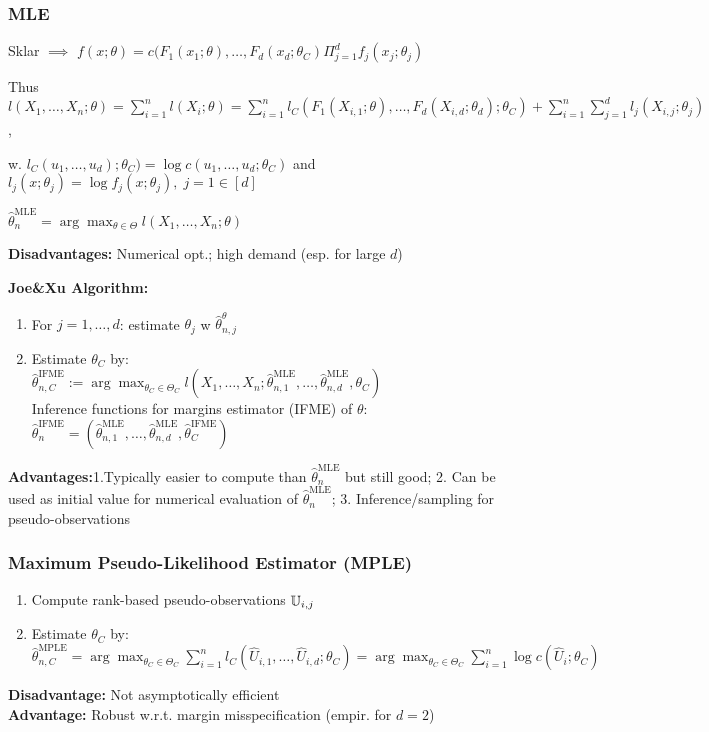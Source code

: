 \subsubsection*{MLE}
Sklar $\implies$ $f(x;\theta)=c(F_1(x_1;\theta),\dots, F_d(x_d;\theta_C)\Pi^d_{j=1} f_j(x_j;\theta_j)$

Thus $l(X_1,\dots,X_n;\theta)=\sum^n_{i=1} l(X_i;\theta)=\sum^n_{i=1} l_C(F_1(X_{i,1};\theta),\dots,F_d(X_{i,d};\theta_d);\theta_C)+\sum^n_{i=1}\sum^d_{j=1} l_j(X_{i,j};\theta_j)$,

w. $l_C(u_1,\dots, u_d);\theta_C)=\log c(u_1,\dots,u_d;\theta_C)$ and $l_j(x;\theta_j)=\log f_j(x;\theta_j),\; j=1\in[d]$

$\hat \theta^{\text{MLE}}_n=\arg\max_{\theta\in\Theta} l(X_1,\dots,X_n;\theta)$

\textbf{Disadvantages:} Numerical opt.; high demand (esp. for large $d$)

\textbf{Joe\&Xu Algorithm:}
\begin{enumerate}
    \item For $j=1,\dots,d$: estimate $\theta_j$ w $\hat\theta^{\theta}_{n,j}$
    \item Estimate $\theta_C$ by:\\
    $\hat\theta^{\text{IFME}}_{n,C}:=\arg\max_{\theta_C\in\Theta_C} l(X_1,\dots,X_n;\hat\theta^{\text{MLE}}_{n,1},\dots,\hat\theta^{\text{MLE}}_{n,d},\theta_C)$\\
    Inference functions for margins estimator (IFME) of $\theta$:\\
    $\hat\theta^{\text{IFME}}_n=(\hat\theta^{\text{MLE}}_{n,1},\dots,\hat\theta^{\text{MLE}}_{n,d},\hat\theta^{\text{IFME}}_C)$
\end{enumerate}
\textbf{Advantages:}1.Typically easier to compute than $\hat\theta^{\text{MLE}}_n$ but still good;
2. Can be used as initial value for numerical evaluation of $\hat\theta^{\text{MLE}}_n$;
3. Inference/sampling for pseudo-observations

\subsubsection*{Maximum Pseudo-Likelihood Estimator (MPLE)}
\begin{enumerate}
    \item Compute rank-based pseudo-observations $\mathbb{U}_{i,j}$
    \item Estimate $\theta_C$ by:\\
    $\hat\theta^{\text{MPLE}}_{n,C}=\arg\max_{\theta_C\in\Theta_C}\sum^n_{i=1} l_C(\hat U_{i,1},\dots,\hat U_{i,d};\theta_C)=\arg\max_{\theta_C\in\Theta_C}\sum^n_{i=1}\log c(\hat U_i;\theta_C)$
\end{enumerate}
\textbf{Disadvantage:} Not asymptotically efficient\\
\textbf{Advantage:} Robust w.r.t. margin misspecification (empir. for $d=2$)

